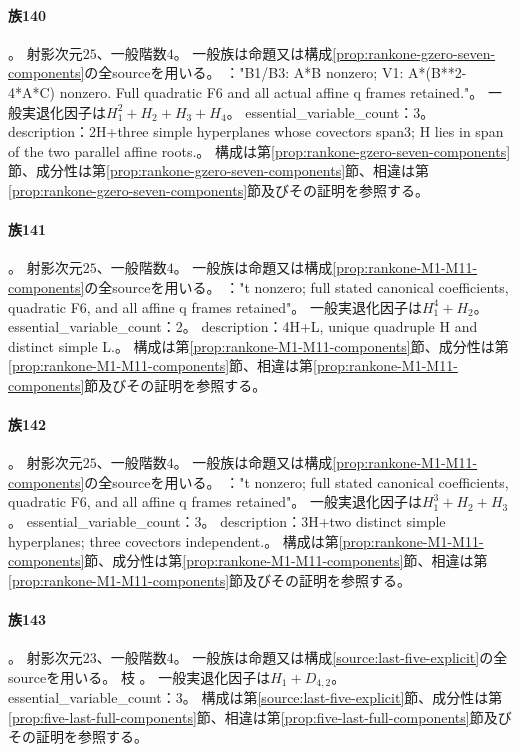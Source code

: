 \paragraph{族140}\label{catalogue:R4_MODULAR_RANK1_GZERO_V1_25}
。
射影次元$25$、一般階数$4$。
一般族は命題又は構成\ref{prop:rankone-gzero-seven-components}の全sourceを用いる。
："B1/B3: A*B nonzero; V1: A*(B**2-4*A*C) nonzero. Full quadratic F6 and all actual affine q frames retained."。
一般実退化因子は$H_{1}^{2}+H_{2}+H_{3}+H_{4}$。
essential\_variable\_count：3。
description：2H+three simple hyperplanes whose covectors span3; H lies in span of the two parallel affine roots.。
構成は第\ref{prop:rankone-gzero-seven-components}節、成分性は第\ref{prop:rankone-gzero-seven-components}節、相違は第\ref{prop:rankone-gzero-seven-components}節及びその証明を参照する。

\paragraph{族141}\label{catalogue:R4_MODULAR_RANK1_GZERO_M1_25}
。
射影次元$25$、一般階数$4$。
一般族は命題又は構成\ref{prop:rankone-M1-M11-components}の全sourceを用いる。
："t nonzero; full stated canonical coefficients, quadratic F6, and all affine q frames retained"。
一般実退化因子は$H_{1}^{4}+H_{2}$。
essential\_variable\_count：2。
description：4H+L, unique quadruple H and distinct simple L.。
構成は第\ref{prop:rankone-M1-M11-components}節、成分性は第\ref{prop:rankone-M1-M11-components}節、相違は第\ref{prop:rankone-M1-M11-components}節及びその証明を参照する。

\paragraph{族142}\label{catalogue:R4_MODULAR_RANK1_GZERO_M11_25}
。
射影次元$25$、一般階数$4$。
一般族は命題又は構成\ref{prop:rankone-M1-M11-components}の全sourceを用いる。
："t nonzero; full stated canonical coefficients, quadratic F6, and all affine q frames retained"。
一般実退化因子は$H_{1}^{3}+H_{2}+H_{3}$。
essential\_variable\_count：3。
description：3H+two distinct simple hyperplanes; three covectors independent.。
構成は第\ref{prop:rankone-M1-M11-components}節、成分性は第\ref{prop:rankone-M1-M11-components}節、相違は第\ref{prop:rankone-M1-M11-components}節及びその証明を参照する。

\paragraph{族143}\label{catalogue:R4_GA9_LINEAR_W_E6_CUSP_TANGENT_23}
。
射影次元$23$、一般階数$4$。
一般族は命題又は構成\ref{source:last-five-explicit}の全sourceを用いる。
枝 。
一般実退化因子は$H_{1}+D_{4,2}$。
essential\_variable\_count：3。
構成は第\ref{source:last-five-explicit}節、成分性は第\ref{prop:five-last-full-components}節、相違は第\ref{prop:five-last-full-components}節及びその証明を参照する。

